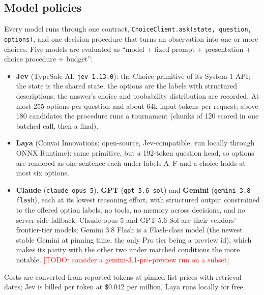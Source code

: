 \documentclass[11pt]{article}
\newcommand{\todo}[1]{\textcolor{red}{[TODO: #1]}}
\begin{document}
\subsection{Model policies}
Every model runs through one contract, \texttt{ChoiceClient.ask(state, question, options)}, and one decision procedure that turns an observation into one or more choices. Five models are evaluated as ``model + fixed prompt + presentation + choice procedure + budget'':
\begin{itemize}
\item \textbf{Jev} (TypeSafe AI, \texttt{jev-1.13.0}): the Choice primitive of its System-1 API; the state is the shared state, the options are the labels with structured descriptions; the answer's choice and probability distribution are recorded. At most 255 options per question and about 64k input tokens per request; above 180 candidates the procedure runs a tournament (chunks of 120 scored in one batched call, then a final).
\item \textbf{Laya} (Convai Innovations; open-source, Jev-compatible; run locally through ONNX Runtime): same primitive, but a 192-token question head, so options are rendered as one sentence each under labels A--F and a choice holds at most six options.
\item \textbf{Claude} (\texttt{claude-opus-5}), \textbf{GPT} (\texttt{gpt-5.6-sol}) and \textbf{Gemini} (\texttt{gemini-3.8-flash}), each at its lowest reasoning effort, with structured output constrained to the offered option labels, no tools, no memory across decisions, and no server-side fallback. Claude opus-5 and GPT-5.6 Sol are their vendors' frontier-tier models; Gemini 3.8 Flash is a Flash-class model (the newest stable Gemini at pinning time, the only Pro tier being a preview id), which makes its parity with the other two under matched conditions the more notable. \todo{consider a gemini-3.1-pro-preview run on a subset}
\end{itemize}
Costs are converted from reported tokens at pinned list prices with retrieval dates; Jev is billed per token at \$0.042 per million, Laya runs locally for free.
\end{document}
